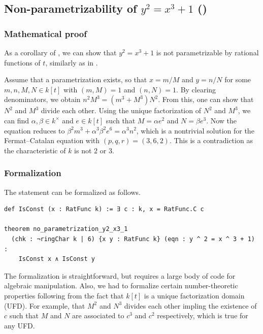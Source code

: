 \documentclass[runningheads]{llncs}
\begin{document}
\subsection{Non-parametrizability of $y^2 = x^3 + 1$ ()}
\label{subsec:pf-elliptic}


\subsubsection{Mathematical proof}

As a corollary of , we can show that $y^2 = x^3 + 1$ is not parametrizable by rational functions of $t$, similarly as in \cite[Proposition 2.3.1]{franz}.

Assume that a parametrization exists, so that $x = m / M$ and $y = n / N$ for some $m, n, M, N \in k[t]$ with $(m, M) = 1$ and $(n, N) = 1$.
By clearing denominators, we obtain $n ^ 2 M ^ 3 = (m ^ 3 + M ^ 3) N ^ 2$. 
From this, one can show that $N^2$ and $M^3$ divide each other.
Using the unique factorization of $N^2$ and $M^3$, we can find $\alpha, \beta \in k^\times$ and $e \in k[t]$ such that $M = \alpha e^2$ and $N = \beta e^3$.
Now the equation reduces to $\beta^2 m^3 + \alpha^3 \beta^2 e^6 = \alpha^3 n^2$, which is a nontrivial solution for the Fermat--Catalan equation with $(p, q, r) = (3, 6, 2)$.
This is a contradiction as the characteristic of $k$ is not $2$ or $3$.


\subsubsection{Formalization}

The statement can be formalized as follows.

\begin{verbatim}
def IsConst (x : RatFunc k) := ∃ c : k, x = RatFunc.C c

theorem no_parametrization_y2_x3_1
  (chk : ¬ringChar k | 6) {x y : RatFunc k} (eqn : y ^ 2 = x ^ 3 + 1) : 
    IsConst x ∧ IsConst y
\end{verbatim}

The formalization is straightforward, but requires a large body of code for algebraic manipulation.
Also, we had to formalize certain number-theoretic properties following from the fact that $k[t]$ is a unique factorization domain (UFD).
For example, that $M^2$ and $N^3$ divides each other 
impling the existence of $c$ such that $M$ and $N$ are associated to $c^3$ and $c^2$ respectively, which is true for any UFD.
\end{document}
